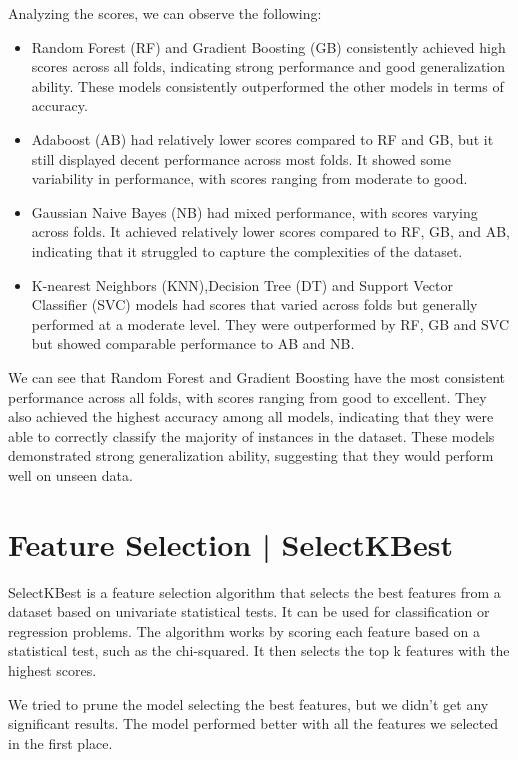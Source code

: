 Analyzing the scores, we can observe the following:
\begin{itemize}
    \item  Random Forest (RF) and Gradient Boosting (GB) consistently achieved high scores across all folds, indicating strong performance and good generalization ability. These models consistently outperformed the other models in terms of accuracy.
    \item Adaboost (AB) had relatively lower scores compared to RF and GB, but it still displayed decent performance across most folds. It showed some variability in performance, with scores ranging from moderate to good.
    \item Gaussian Naive Bayes (NB) had mixed performance, with scores varying across folds. It achieved relatively lower scores compared to RF, GB, and AB, indicating that it struggled to capture the complexities of the dataset.
    \item K-nearest Neighbors (KNN),Decision Tree (DT) and Support Vector Classifier (SVC) models had scores that varied across folds but generally performed at a moderate level. They were outperformed by RF, GB and SVC but showed comparable performance to AB and NB.
\end{itemize}

We can see that Random Forest and Gradient Boosting have the most consistent performance across all folds, with scores ranging from good to excellent. They also achieved the highest accuracy among all models, indicating that they were able to correctly classify the majority of instances in the dataset. These models demonstrated strong generalization ability, suggesting that they would perform well on unseen data.

\section{Feature Selection | SelectKBest}
SelectKBest is a feature selection algorithm that selects the best features from a dataset based on univariate statistical tests. It can be used for classification or regression problems. The algorithm works by scoring each feature based on a statistical test, such as the chi-squared. It then selects the top k features with the highest scores.

We tried to prune the model selecting the best features, but we didn't get any significant results. The model performed better with all the features we selected in the first place.

